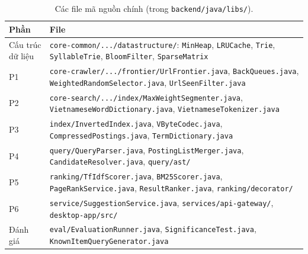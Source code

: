 \documentclass[9pt,twocolumn,a4paper]{extarticle}
\newcommand{\code}[1]{\texttt{#1}}
\begin{document}
\begin{table}[H]
\centering
\caption{Các file mã nguồn chính (trong \code{backend/java/libs/}).}
\label{tab:src}
\footnotesize
\begin{tabular}{@{}p{1.6cm}>{\raggedright\arraybackslash}p{6.1cm}@{}}
\toprule
Phần & File \\
\midrule
Cấu trúc dữ liệu & \mbox{\code{core-common/.../datastructure/}}: \mbox{\code{MinHeap}}, \mbox{\code{LRUCache}}, \mbox{\code{Trie}}, \mbox{\code{SyllableTrie}}, \mbox{\code{BloomFilter}}, \mbox{\code{SparseMatrix}} \\
P1 & \mbox{\code{core-crawler/.../frontier/UrlFrontier.java}}, \mbox{\code{BackQueues.java}}, \mbox{\code{WeightedRandomSelector.java}}, \mbox{\code{UrlSeenFilter.java}} \\
P2 & \mbox{\code{core-search/.../index/MaxWeightSegmenter.java}}, \mbox{\code{VietnameseWordDictionary.java}}, \mbox{\code{VietnameseTokenizer.java}} \\
P3 & \mbox{\code{index/InvertedIndex.java}}, \mbox{\code{VByteCodec.java}}, \mbox{\code{CompressedPostings.java}}, \mbox{\code{TermDictionary.java}} \\
P4 & \mbox{\code{query/QueryParser.java}}, \mbox{\code{PostingListMerger.java}}, \mbox{\code{CandidateResolver.java}}, \mbox{\code{query/ast/}} \\
P5 & \mbox{\code{ranking/TfIdfScorer.java}}, \mbox{\code{BM25Scorer.java}}, \mbox{\code{PageRankService.java}}, \mbox{\code{ResultRanker.java}}, \mbox{\code{ranking/decorator/}} \\
P6 & \mbox{\code{service/SuggestionService.java}}, \mbox{\code{services/api-gateway/}}, \mbox{\code{desktop-app/src/}} \\
Đánh giá & \mbox{\code{eval/EvaluationRunner.java}}, \mbox{\code{SignificanceTest.java}}, \mbox{\code{KnownItemQueryGenerator.java}} \\
\bottomrule
\end{tabular}
\end{table}
\end{document}
